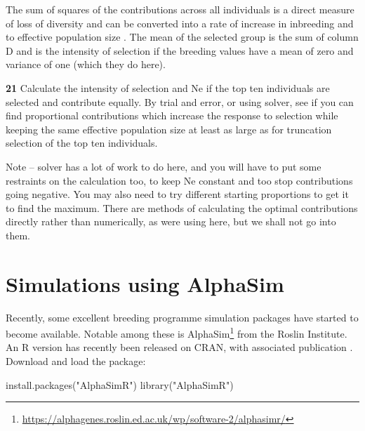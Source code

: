 \documentclass[
]{book}
\makeatletter
\newenvironment{Shaded}{\begin{snugshade}}{\end{snugshade}}
\newcommand{\FunctionTok}[1]{\textcolor[rgb]{0.00,0.00,0.00}{#1}}
\newcommand{\NormalTok}[1]{#1}
\newcommand{\StringTok}[1]{\textcolor[rgb]{0.31,0.60,0.02}{#1}}
\renewcommand{\href}[2]{#2\footnote{\url{#1}}}
\newenvironment{kframe}{%
\medskip{}
\setlength{\fboxsep}{.8em}
 \def\at@end@of@kframe{}%
 \ifinner\ifhmode%
  \def\at@end@of@kframe{\end{minipage}}%
  \begin{minipage}{\columnwidth}%
 \fi\fi%
 \def\FrameCommand##1{\hskip\@totalleftmargin \hskip-\fboxsep
 \colorbox{shadecolor}{##1}\hskip-\fboxsep
     \hskip-\linewidth \hskip-\@totalleftmargin \hskip\columnwidth}%
 \MakeFramed {\advance\hsize-\width
   \@totalleftmargin\z@ \linewidth\hsize
   \@setminipage}}%
 {\par\unskip\endMakeFramed%
 \at@end@of@kframe}
\newenvironment{rmdblock}[1]
  {
  \begin{itemize}
  \renewcommand{\labelitemi}{
    \raisebox{-.7\height}[0pt][0pt]{
      {\setkeys{Gin}{width=3em,keepaspectratio}\texttt{[image: images/\#1]}}
    }
  }
  \setlength{\fboxsep}{1em}
  \begin{kframe}
  \item
  }
  {
  \end{kframe}
  \end{itemize}
  }
\newenvironment{rmdnote}
  {\begin{rmdblock}{note}}
  {\end{rmdblock}}
\newenvironment{rmdquiz}
  {\begin{rmdblock}{quiz}}
  {\end{rmdblock}}
\makeatother
\begin{document}
The sum of squares of the contributions across all individuals is a direct measure of loss of diversity and can be converted into a rate of increase in inbreeding and to effective population size \citep{mackay_accelerated_1999}. The mean of the selected group is the sum of column D and is the intensity of selection if the breeding values have a mean of zero and variance of one (which they do here).

\begin{rmdquiz}
\textbf{21}
Calculate the intensity of selection and Ne if the top ten individuals are selected and contribute equally. By trial and error, or using solver, see if you can find proportional contributions which increase the response to selection while keeping the same effective population size at least as large as for truncation selection of the top ten individuals.
\end{rmdquiz}

\begin{rmdnote}
Note -- solver has a lot of work to do here, and you will have to put some restraints on the calculation too, to keep Ne constant and too stop contributions going negative. You may also need to try different starting proportions to get it to find the maximum. There are methods of calculating the optimal contributions directly rather than numerically, as were using here, but we shall not go into them.
\end{rmdnote}

\hypertarget{simulations-using-alphasim}{%
\section{Simulations using AlphaSim}\label{simulations-using-alphasim}}

Recently, some excellent breeding programme simulation packages have started to become available. Notable among these is \href{https://alphagenes.roslin.ed.ac.uk/wp/software-2/alphasimr/}{AlphaSim} from the Roslin Institute. An R version has recently been released on CRAN, with associated publication \citep{Gaynor2020}. Download and load the package:

\begin{Shaded}
\begin{Highlighting}[]
\FunctionTok{install.packages}\NormalTok{(}\StringTok{"AlphaSimR"}\NormalTok{)}
\FunctionTok{library}\NormalTok{(}\StringTok{"AlphaSimR"}\NormalTok{)}
\end{Highlighting}
\end{Shaded}
\end{document}
